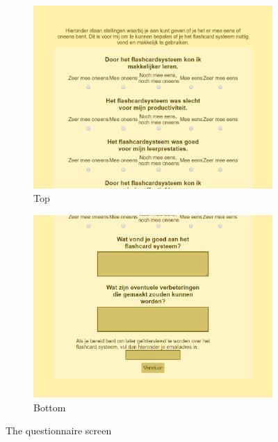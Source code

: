 \begin{figure}
    \begin{subfigure}{0.4\textwidth}
        \centering
        \includegraphics[width=\textwidth]{img/ui_questionnaire_top.png}
        \caption{Top}
        \label{fig:ui_questionnaire_top}
    \end{subfigure}
    \qquad
    \begin{subfigure}{0.4\textwidth}
        \centering
        \includegraphics[width=\textwidth]{img/ui_questionnaire_bottom.png}
        \caption{Bottom}
        \label{fig:ui_questionnaire_bottom}
    \end{subfigure}
    \caption{The questionnaire screen}
    \label{fig:ui_questionnaire}
\end{figure}

